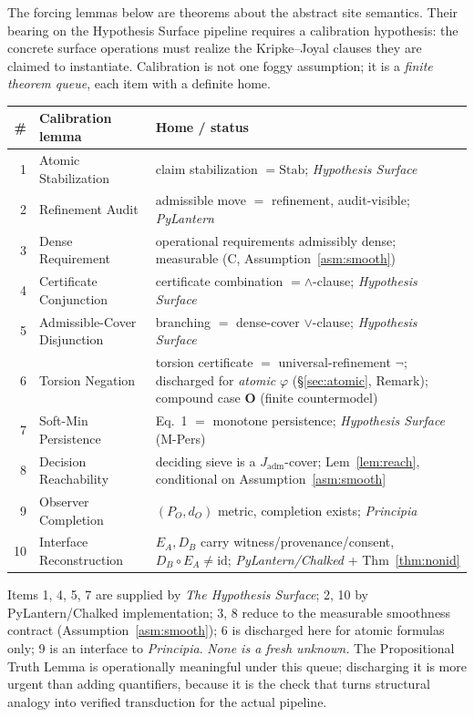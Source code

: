 \documentclass[11pt]{article}
\theoremstyle{definition}
\theoremstyle{remark}
\newcommand{\Stab}{\mathrm{Stab}}
\newcommand{\Jadm}{J_{\mathrm{adm}}}
\begin{document}
The forcing lemmas below are theorems about the abstract site semantics. Their bearing on the
Hypothesis Surface pipeline requires a calibration hypothesis: the concrete surface operations must
realize the Kripke--Joyal clauses they are claimed to instantiate. Calibration is not one foggy
assumption; it is a \emph{finite theorem queue}, each item with a definite home.

\begin{center}
\renewcommand{\arraystretch}{1.2}
\begin{tabular}{@{}r p{} p{}@{}}
\toprule
\# & \textbf{Calibration lemma} & \textbf{Home / status}\\
\midrule
1 & Atomic Stabilization & claim stabilization $=\Stab$; \emph{Hypothesis Surface}\\
2 & Refinement Audit & admissible move $=$ refinement, audit-visible; \emph{PyLantern}\\
3 & Dense Requirement & operational requirements admissibly dense; measurable (C, Assumption~\ref{asm:smooth})\\
4 & Certificate Conjunction & certificate combination $=\wedge$-clause; \emph{Hypothesis Surface}\\
5 & Admissible-Cover Disjunction & branching $=$ dense-cover $\vee$-clause; \emph{Hypothesis Surface}\\
6 & Torsion Negation & torsion certificate $=$ universal-refinement $\neg$; discharged for \emph{atomic} $\varphi$ (\S\ref{sec:atomic}, Remark); compound case \textbf{O} (finite countermodel)\\
7 & Soft-Min Persistence & Eq.~1 $=$ monotone persistence; \emph{Hypothesis Surface} (M-Pers)\\
8 & Decision Reachability & deciding sieve is a $\Jadm$-cover; Lem~\ref{lem:reach}, conditional on Assumption~\ref{asm:smooth}\\
9 & Observer Completion & $(P_O,d_O)$ metric, completion exists; \emph{Principia}\\
10 & Interface Reconstruction & $E_A,D_B$ carry witness/provenance/consent, $D_B\!\circ\! E_A\neq\mathrm{id}$; \emph{PyLantern/Chalked} + Thm~\ref{thm:nonid}\\
\bottomrule
\end{tabular}
\end{center}

Items 1, 4, 5, 7 are supplied by \emph{The Hypothesis Surface}; 2, 10 by PyLantern/Chalked
implementation; 3, 8 reduce to the measurable smoothness contract (Assumption~\ref{asm:smooth}); 6
is discharged here for atomic formulas only; 9 is an interface to \emph{Principia}. \emph{None is a
fresh unknown.} The Propositional Truth Lemma
is operationally meaningful under this queue; discharging it is more urgent than adding quantifiers,
because it is the check that turns structural analogy into verified transduction for the actual
pipeline.
\end{document}
